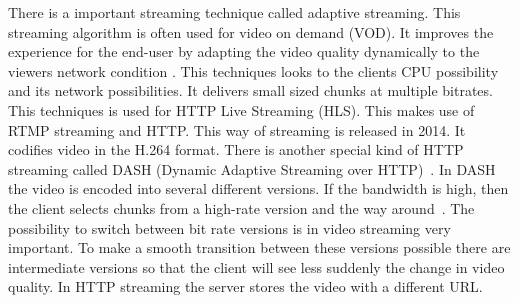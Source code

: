 \documentclass{sig-alternate-br}
\begin{document}
There is a important streaming technique called adaptive streaming. This streaming algorithm is often used for video on demand (VOD). It improves the experience for the end-user by adapting the video quality dynamically to the viewers network condition \cite{ffmpeg}. This techniques looks to the clients CPU possibility and its network possibilities. It delivers small sized chunks at multiple bitrates. This techniques is used for HTTP Live Streaming (HLS). This makes use of RTMP streaming and HTTP. This way of streaming is released in 2014. It codifies video in the H.264 format.\newline
There is another special kind of HTTP streaming called DASH (Dynamic Adaptive Streaming over HTTP)~\cite{computer-networking}. In DASH the video is encoded into several different versions. If the bandwidth is high, then the client selects chunks from a high-rate version and the way around~\cite{computer-networking}. The possibility to switch between bit rate versions is in video streaming very important. To make a smooth transition between these versions possible there are intermediate versions so that the client will see less suddenly the change in video quality. In HTTP streaming the server stores the video with a different URL.   
\end{document}
